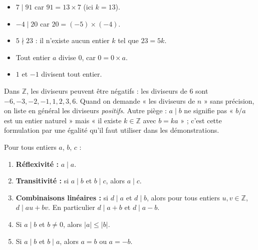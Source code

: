 \documentclass[11pt]{article}
\begin{document}
\begin{exemplebox}
\begin{itemize}
\item $7 \mid 91$ car $91 = 13 \times 7$ (ici $k = 13$).
\item $-4 \mid 20$ car $20 = (-5) \times (-4)$.
\item $5 \nmid 23$ : il n'existe aucun entier $k$ tel que $23 = 5k$.
\item Tout entier $a$ divise $0$, car $0 = 0 \times a$.
\item $1$ et $-1$ divisent tout entier.
\end{itemize}
\end{exemplebox}

\begin{attention}
Dans $\mathbb{Z}$, les diviseurs peuvent être négatifs : les diviseurs de $6$ sont $-6, -3, -2, -1, 1, 2, 3, 6$. Quand on demande « les diviseurs de $n$ » sans précision, on liste en général les diviseurs \emph{positifs}. Autre piège : $a \mid b$ ne signifie pas « $b/a$ est un entier naturel » mais « il existe $k \in \mathbb{Z}$ avec $b = ka$ » ; c'est cette formulation par une égalité qu'il faut utiliser dans les démonstrations.
\end{attention}

\begin{propriete}
Pour tous entiers $a$, $b$, $c$ :
\begin{enumerate}
\item \textbf{Réflexivité :} $a \mid a$.
\item \textbf{Transitivité :} si $a \mid b$ et $b \mid c$, alors $a \mid c$.
\item \textbf{Combinaisons linéaires :} si $d \mid a$ et $d \mid b$, alors pour tous entiers $u, v \in \mathbb{Z}$, $d \mid au + bv$. En particulier $d \mid a+b$ et $d \mid a-b$.
\item Si $a \mid b$ et $b \neq 0$, alors $|a| \leq |b|$.
\item Si $a \mid b$ et $b \mid a$, alors $a = b$ ou $a = -b$.
\end{enumerate}
\end{propriete}
\end{document}

